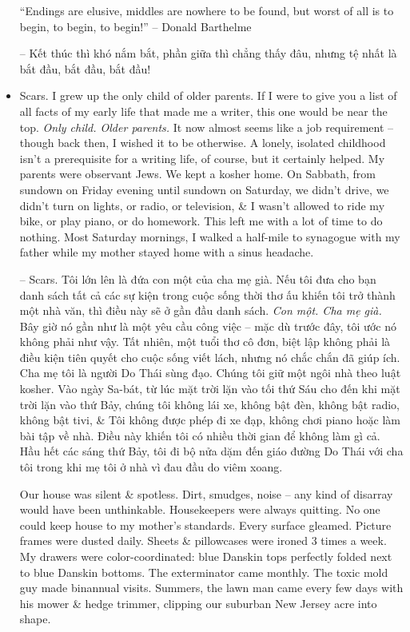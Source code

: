 \documentclass{article}
\begin{document}
\begin{itemize}
	``Endings are elusive, middles are nowhere to be found, but worst of all is to begin, to begin, to begin!'' -- {\sc Donald Barthelme}
	
	-- Kết thúc thì khó nắm bắt, phần giữa thì chẳng thấy đâu, nhưng tệ nhất là bắt đầu, bắt đầu, bắt đầu!
	\item {\sf Scars.} I grew up the only child of older parents. If I were to give you a list of all facts of my early life that made me a writer, this one would be near the top. {\it Only child. Older parents.} It now almost seems like a job requirement -- though back then, I wished it to be otherwise.  A lonely, isolated childhood isn't a prerequisite for a writing life, of course, but it certainly helped. My parents were observant Jews. We kept a kosher home. On Sabbath, from sundown on Friday evening until sundown on Saturday, we didn't drive, we didn't turn on lights, or radio, or television, \& I wasn't allowed to ride my bike, or play piano, or do homework. This left me with a lot of time to do nothing. Most Saturday mornings, I walked a half-mile to synagogue with my father while my mother stayed home with a sinus headache.
	
	-- {\sf Scars.} Tôi lớn lên là đứa con một của cha mẹ già. Nếu tôi đưa cho bạn danh sách tất cả các sự kiện trong cuộc sống thời thơ ấu khiến tôi trở thành một nhà văn, thì điều này sẽ ở gần đầu danh sách. {\it Con một. Cha mẹ già.} Bây giờ nó gần như là một yêu cầu công việc -- mặc dù trước đây, tôi ước nó không phải như vậy. Tất nhiên, một tuổi thơ cô đơn, biệt lập không phải là điều kiện tiên quyết cho cuộc sống viết lách, nhưng nó chắc chắn đã giúp ích. Cha mẹ tôi là người Do Thái sùng đạo. Chúng tôi giữ một ngôi nhà theo luật kosher. Vào ngày Sa-bát, từ lúc mặt trời lặn vào tối thứ Sáu cho đến khi mặt trời lặn vào thứ Bảy, chúng tôi không lái xe, không bật đèn, không bật radio, không bật tivi, \& Tôi không được phép đi xe đạp, không chơi piano hoặc làm bài tập về nhà. Điều này khiến tôi có nhiều thời gian để không làm gì cả. Hầu hết các sáng thứ Bảy, tôi đi bộ nửa dặm đến giáo đường Do Thái với cha tôi trong khi mẹ tôi ở nhà vì đau đầu do viêm xoang.
	
	Our house was silent \& spotless. Dirt, smudges, noise -- any kind of disarray would have been unthinkable. Housekeepers were always quitting. No one could keep house to my mother's standards. Every surface gleamed. Picture frames were dusted daily. Sheets \& pillowcases were ironed 3 times a week. My drawers were color-coordinated: blue Danskin tops perfectly folded next to blue Danskin bottoms. The exterminator came monthly. The toxic mold guy made binannual visits. Summers, the lawn man came every few days with his mower \& hedge trimmer, clipping our suburban New Jersey acre into shape.
	

\end{itemize}
\end{document}
